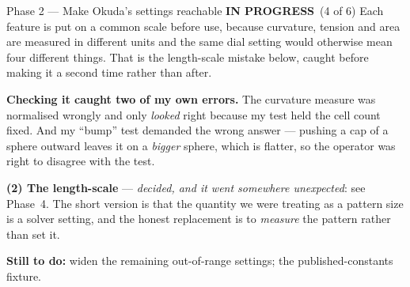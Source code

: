 \documentclass[11pt,a4paper]{article}
\newcommand{\prog}{\textcolor{warn}{\textbf{IN PROGRESS}}}
\begin{document}
\begin{phasebox}{Phase 2 --- Make Okuda's settings reachable \hfill \prog\ (4 of 6)}
Each feature is put on a common scale before use, because curvature, tension and area are measured
in different units and the same dial setting would otherwise mean four different things. That is
the length-scale mistake below, caught before making it a second time rather than after.

\textbf{Checking it caught two of my own errors.} The curvature measure was normalised wrongly and
only \emph{looked} right because my test held the cell count fixed. And my ``bump'' test demanded
the wrong answer --- pushing a cap of a sphere outward leaves it on a \emph{bigger} sphere, which is
flatter, so the operator was right to disagree with the test.

\textbf{(2) The length-scale} --- \emph{decided, and it went somewhere unexpected}: see Phase~4.
The short version is that the quantity we were treating as a pattern size is a solver setting, and
the honest replacement is to \emph{measure} the pattern rather than set it.

\textbf{Still to do:} widen the remaining out-of-range settings; the published-constants fixture.
\end{phasebox}
\end{document}
